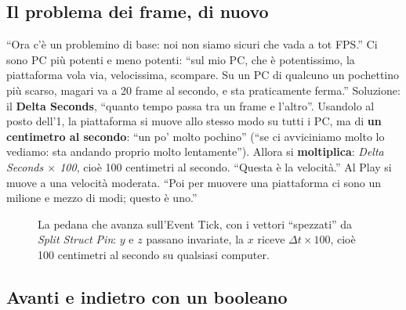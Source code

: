 \subsection{Il problema dei frame, di nuovo}

``Ora c'è un problemino di base: noi non siamo sicuri che vada a tot FPS.'' Ci
sono PC più potenti e meno potenti: ``sul mio PC, che è potentissimo, la
piattaforma vola via, velocissima, scompare. Su un PC di qualcuno un pochettino
più scarso, magari va a 20 frame al secondo, e sta praticamente ferma.''
Soluzione: il \textbf{Delta Seconds}, ``quanto tempo passa tra un frame e
l'altro''. Usandolo al posto dell'1, la piattaforma si muove allo stesso modo su
tutti i PC, ma di \textbf{un centimetro al secondo}: ``un po' molto pochino''
(``se ci avviciniamo molto lo vediamo: sta andando proprio molto lentamente'').
Allora si \textbf{moltiplica}: \emph{Delta Seconds $\times$ 100}, cioè 100
centimetri al secondo. ``Questa è la velocità.'' Al Play si muove a una velocità
moderata. ``Poi per muovere una piattaforma ci sono un milione e mezzo di modi;
questo è uno.''

\begin{figure}[htbp]
\centering
\begin{bpgraph}
\end{bpgraph}
\caption{La pedana che avanza sull'Event Tick, con i vettori ``spezzati'' da
\emph{Split Struct Pin}: $y$ e $z$ passano invariate, la $x$ riceve
$\Delta t \times 100$, cioè 100 centimetri al secondo su qualsiasi computer.}
\label{gd13:fig:pedana-tick}
\end{figure}

\subsection{Avanti e indietro con un booleano}

